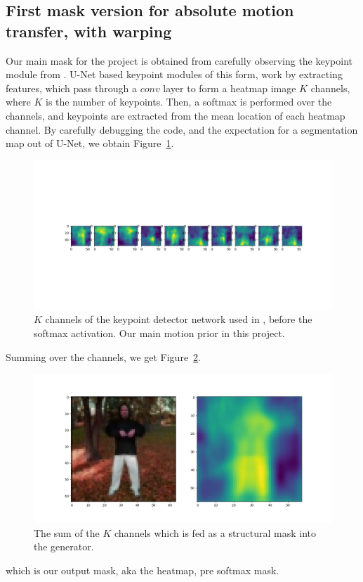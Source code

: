 \documentclass{article}
\begin{document}
\subsection{First mask version for absolute motion transfer, with warping}
Our main mask for the project is obtained from carefully observing the
keypoint module from \cite{siarohin2020order}. U-Net based keypoint
modules of this form, work by extracting features, which pass through a
$\textit{conv}$ layer to form a heatmap image $K$ channels, where $K$ is the
number of keypoints. Then, a softmax is performed over the channels, and
keypoints are extracted from the mean location of each heatmap channel.
By carefully debugging the code, and the expectation for a segmentation map
out of U-Net, we obtain Figure~\ref{mask-10kp}.
\begin{figure}[ht]
\vskip 0.2in
\begin{center}
\centerline{\includegraphics[width=\columnwidth]{visualizations/mask_10kp}}
\caption{
$K$ channels of the keypoint detector network used in
\cite{siarohin2020order}, before the softmax activation. Our main motion
prior in this project.
}
\label{mask-10kp}
\end{center}
\vskip -0.2in
\end{figure}

Summing over the channels, we get Figure~\ref{mask-sum}.

\begin{figure}[ht]
\vskip 0.2in
\begin{center}
\centerline{\includegraphics[width=\columnwidth]{visualizations/mask_sum}}
\caption{
The sum of the $K$ channels which is fed as a structural mask into the
generator.
}
\label{mask-sum}
\end{center}
\vskip -0.2in
\end{figure}
which is our output mask, aka the heatmap, pre softmax mask.
\end{document}
